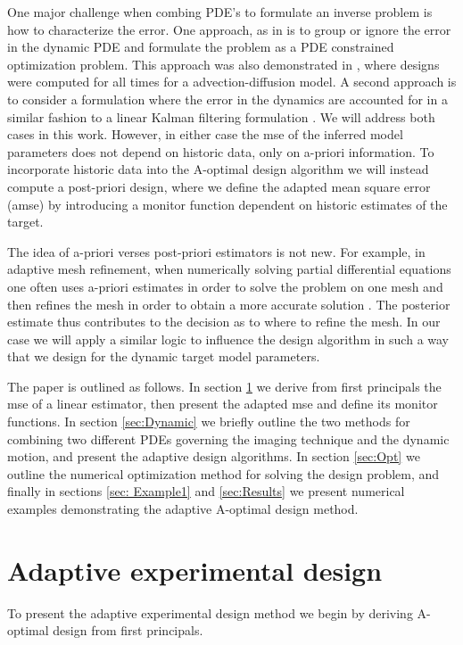\documentclass[11pt]{article}
\begin{document}
One major challenge when combing PDE's to formulate an inverse problem is how to characterize the error. One approach, as in \cite{Fohring2014} is to group or ignore the error in the dynamic PDE and formulate the problem as a PDE constrained optimization problem. This approach was also demonstrated in  \cite{Alexanderian2014}, where designs were computed for all times for a advection-diffusion model.  A second approach is to consider a formulation where the error in the dynamics are accounted for in a similar fashion to a linear Kalman filtering formulation \cite{Kalman1960}. We will address both cases in this work. However, in either case the mse of the inferred model parameters does not depend on historic data, only on a-priori information. To incorporate historic data into the A-optimal design algorithm we will instead compute a post-priori design, where we define the adapted mean square error  (amse) by introducing a monitor function dependent on historic estimates of the  target. 

The idea of a-priori verses post-priori  estimators is not new. For example, in adaptive mesh refinement, when numerically 
solving partial differential
equations one often uses a-priori estimates in order to solve the problem on one mesh 
and then refines the mesh in order to obtain a more accurate solution \cite{Multigrid}. The posterior estimate thus contributes to the decision as to where to refine the mesh. In our case we will apply a similar logic to influence the design algorithm in such a way that we design for the dynamic target model parameters. 

\bigskip

The paper is outlined as follows. In section \ref{sec: Adaptive} we derive from first principals the mse of a linear estimator, then present the adapted mse and define its monitor functions. In section \ref{sec:Dynamic} we briefly outline the two methods for combining two different PDEs governing the imaging technique and the dynamic motion, and present the adaptive design algorithms.  
In section \ref{sec:Opt} we outline the numerical optimization method for solving the design problem, and finally in sections \ref{sec: Example1} and \ref{sec:Results} we present  numerical examples demonstrating the adaptive A-optimal design method. 




\section{ Adaptive experimental design }
\label{sec: Adaptive}
To present the adaptive experimental design method we begin by deriving A-optimal design from first principals.
\end{document}
